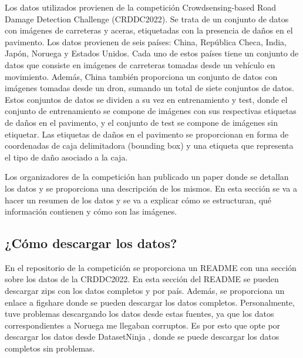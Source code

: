 Los datos utilizados provienen de la competición Crowdsensing-based Road Damage Detection Challenge (CRDDC2022). Se trata de un conjunto de datos con imágenes de carreteras y aceras, etiquetadas con la presencia de daños en el pavimento. Los datos provienen de seis países: China, República Checa, India, Japón, Noruega y Estados Unidos. Cada uno de estos países tiene un conjunto de datos que consiste en imágenes de carreteras tomadas desde un vehículo en movimiento. Además, China también proporciona un conjunto de datos con imágenes tomadas desde un dron, sumando un total de siete conjuntos de datos. Estos conjuntos de datos se dividen a su vez en entrenamiento y test, donde el conjunto de entrenamiento se compone de imágenes con sus respectivas etiquetas de daños en el pavimento, y el conjunto de test se compone de imágenes sin etiquetar. Las etiquetas de daños en el pavimento se proporcionan en forma de coordenadas de caja delimitadora (bounding box) y una etiqueta que representa el tipo de daño asociado a la caja. 

Los organizadores de la competición han publicado un paper \cite{RDD2022_data_paper} donde se detallan los datos y se proporciona una descripción de los mismos. En esta sección se va a hacer un resumen de los datos y se va a explicar cómo se estructuran, qué información contienen y cómo son las imágenes.

\subsection{¿Cómo descargar los datos?}
En el repositorio de la competición \cite{RoadDamageDetector_repo} se proporciona un README con una sección sobre los datos de la CRDDC2022. En esta sección del README se pueden descargar zips con los datos completos y por país. Además, se proporciona un enlace a figshare \cite{RDD2022_dataset} donde se pueden descargar los datos completos. Personalmente, tuve problemas descargando los datos desde estas fuentes, ya que los datos correspondientes a Noruega me llegaban corruptos. Es por esto que opte por descargar los datos desde DatasetNinja \cite{RDD2022_datasetNinja}, donde se puede descargar los datos completos sin problemas.


